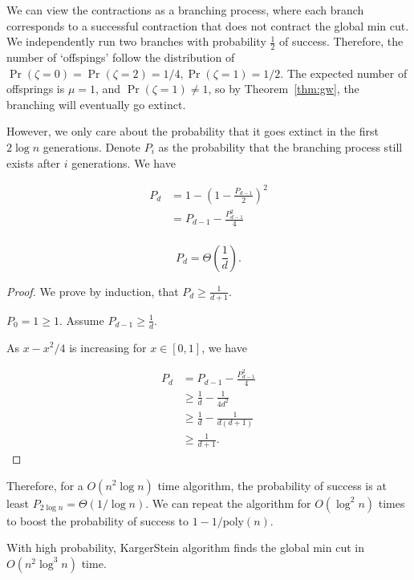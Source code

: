 We can view the contractions as a branching process, where each branch corresponds to a successful contraction that does not contract the global min cut.
We independently run two branches with probability $\frac{1}{2}$ of success. Therefore, the number of `offspings' follow the distribution of $\Pr(\zeta = 0) = \Pr(\zeta = 2) = 1/4, \Pr(\zeta = 1) = 1/2$. The expected number of offsprings is $\mu = 1$, and $\Pr(\zeta = 1) \neq 1$, so by Theorem~\ref{thm:gw}, the branching will eventually go extinct.

However, we only care about the probability that it goes extinct in the first $2\log n$ generations. Denote $P_i$ as the probability that the branching process still exists after $i$ generations. We have

\begin{align*}
	P_d & = 1-(1-\frac{P_{d-1}}{2})^2     \\
	    & = P_{d-1} - \frac{P_{d-1}^2}{4} \\
\end{align*}

\begin{lemma}
	\[ P_d = \Theta(\frac{1}{d}) .\]
\end{lemma}
\begin{proof}
	We prove by induction, that $P_d \geq \frac{1}{d+1}$.

	$P_0 = 1\geq 1$. Assume $P_{d-1} \geq \frac{1}{d}$.

	As $x - x^2/4$ is increasing for $x\in [0,1]$, we have

	\begin{align*}
		P_d & = P_{d-1} - \frac{P_{d-1}^2}{4}     \\
		    & \geq \frac{1}{d} - \frac{1}{4d^2}   \\
		    & \geq \frac{1}{d} - \frac{1}{d(d+1)} \\
		    & \geq \frac{1}{d+1}.
	\end{align*}
\end{proof}

Therefore, for a $O(n^2\log n)$ time algorithm, the probability of success is at least $P_{2\log n} = \Theta(1/\log n)$. We can repeat the algorithm for $O(\log^2 n)$ times to boost the probability of success to $1 - 1/\text{poly}(n)$.

\begin{theorem}
	With high probability, KargerStein algorithm finds the global min cut in $O(n^2\log^3 n)$ time.
\end{theorem}
